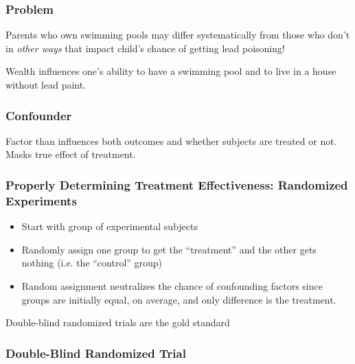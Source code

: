 \documentclass[handout]{beamer}
\begin{document}
\begin{frame}
\frametitle{Problem}
	Parents who own swimming pools may differ systematically from those who don't in 				\emph{other ways} that impact child's chance of getting lead poisoning!
	\vspace{2em}
	\begin{alertblock}{Wealth influences one's ability to have a swimming pool and to live in a house without lead paint.}
	\end{alertblock}
\end{frame}

\begin{frame}
\frametitle{Confounder}
	Factor than influences both outcomes and whether subjects are treated or not. Masks true 			effect of treatment.
\end{frame}

\begin{frame}
\frametitle{Properly Determining Treatment Effectiveness: Randomized Experiments}
	\begin{itemize}
		\item Start with group of experimental subjects
		\item Randomly assign one group to get the ``treatment'' and the other gets nothing (i.e. the ``control'' group)
		\item Random assignment neutralizes the chance of confounding factors since groups are 			initially equal, on average, and only difference is the treatment.
	\end{itemize}
	\alert{Double-blind randomized trials are the gold standard}
\end{frame}

\begin{frame}
\frametitle{Double-Blind Randomized Trial}
\begin{figure}
\centering
{}
\end{figure}
\end{frame}
\end{document}
